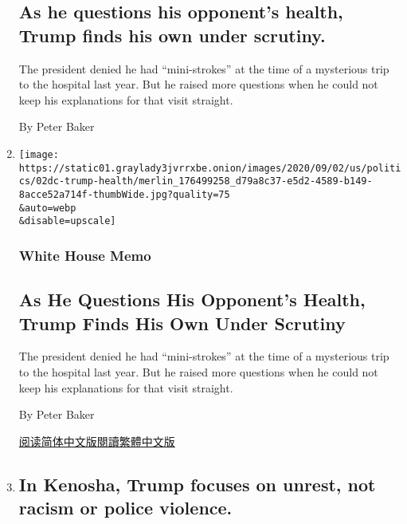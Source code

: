 \begin{enumerate}
{  \subsection{As he questions his opponent's health, Trump finds his own
  under
  scrutiny.}\label{as-he-questions-his-opponents-health-trump-finds-his-own-under-scrutiny}}

  The president denied he had ``mini-strokes'' at the time of a
  mysterious trip to the hospital last year. But he raised more
  questions when he could not keep his explanations for that visit
  straight.

  By Peter Baker
\item
  \href{/2020/09/02/us/politics/trump-health.html}{}

  \texttt{[image: https://static01.graylady3jvrrxbe.onion/images/2020/09/02/us/politics/02dc-trump-health/merlin\_176499258\_d79a8c37-e5d2-4589-b149-8acce52a714f-thumbWide.jpg?quality=75\\\&auto=webp\\\&disable=upscale]}

  \hypertarget{white-house-memo}{%
  \subsubsection{White House Memo}\label{white-house-memo}}

  \hypertarget{as-he-questions-his-opponents-health-trump-finds-his-own-under-scrutiny-1}{%
  \subsection{As He Questions His Opponent's Health, Trump Finds His Own
  Under
  Scrutiny}\label{as-he-questions-his-opponents-health-trump-finds-his-own-under-scrutiny-1}}

  The president denied he had ``mini-strokes'' at the time of a
  mysterious trip to the hospital last year. But he raised more
  questions when he could not keep his explanations for that visit
  straight.

  By Peter Baker

  \href{https://cn.nytimes3xbfgragh.onion/usa/20200904/trump-health/}{阅读简体中文版}\href{https://cn.nytimes3xbfgragh.onion/usa/20200904/trump-health/zh-hant/}{閱讀繁體中文版}
\item
  \href{/live/2020/09/01/us/trump-vs-biden/in-kenosha-trump-focuses-on-unrest-not-racism-or-police-violence}{}

  \hypertarget{in-kenosha-trump-focuses-on-unrest-not-racism-or-police-violence}{%
  \subsection{In Kenosha, Trump focuses on unrest, not racism or police
  violence.}\label{in-kenosha-trump-focuses-on-unrest-not-racism-or-police-violence}}


\end{enumerate}
